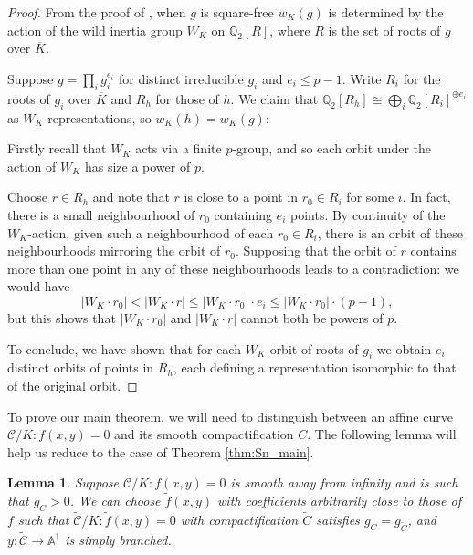 \documentclass[12pt]{amsart}
\newtheorem{lemma}[theorem]{Lemma}
\theoremstyle{definition}
\theoremstyle{remark}
\newcommand{\QQ}{\mathbb{Q}}
\renewcommand{\bar}{\overline}
\renewcommand{\tilde}{\widetilde}
\begin{document}
\begin{proof}
    From the proof of \cite[Theorem 11.3]{M2D2}, when $g$ is square-free $w_K(g)$ is determined by the action of the wild inertia group $W_K$ on $\QQ_2[R]$, where $R$ is the set of roots of $g$ over $\bar{K}$.
    
    Suppose $g=\prod_ig_i^{e_i}$ for distinct irreducible $g_i$ and $e_i\le p-1$. Write $R_i$ for the roots of $g_i$ over $\bar{K}$ and $R_h$ for those of $h$. We claim that $\QQ_2[R_h]\cong\bigoplus_i\QQ_2[R_i]^{\oplus e_i}$ as $W_K$-representations, so $w_K(h)=w_K(g)$:

    Firstly recall that $W_K$ acts via a finite $p$-group, and so each orbit under the action of $W_K$ has size a power of $p$.
    
    Choose $r\in R_h$ and note that $r$ is close to a point in $r_0\in R_i$ for some $i$. In fact, there is a small neighbourhood of $r_0$ containing $e_i$ points. By continuity of the $W_K$-action, given such a neighbourhood of each $r_0\in R_i$, there is an orbit of these neighbourhoods mirroring the orbit of $r_0$. Supposing that the orbit of $r$ contains more than one point in any of these neighbourhoods leads to a contradiction: we would have
    \[|W_K\cdot r_0|<|W_K\cdot r|\le |W_K\cdot r_0|\cdot e_i \le |W_K\cdot r_0| \cdot (p-1),\] but this shows that $|W_K\cdot r_0|$ and $|W_K\cdot r|$ cannot both be powers of $p$.

    To conclude, we have shown that for each $W_K$-orbit of roots of $g_i$ we obtain $e_i$ distinct orbits of points in $R_h$, each defining a representation isomorphic to that of the original orbit.
\end{proof}

To prove our main theorem, we will need to distinguish between an affine curve $\mathcal{C}/K: f(x,y)=0$ and its smooth compactification $C$. The following lemma will help us reduce to the case of Theorem \ref{thm:Sn_main}.

\begin{lemma}\label{lem:perturb}
    Suppose $\mathcal{C}/K: f(x,y)=0$ is smooth away from infinity and is such that $g_C>0$. We can choose $\tilde{f}(x,y)$ with coefficients arbitrarily close to those of $f$ such that $\tilde{\mathcal{C}}/K: \tilde{f}(x,y)=0$ with compactification $\tilde{C}$ satisfies $g_C=g_{\tilde{C}}$, and $y: \tilde{\mathcal{C}}\to\mathbb{A}^1$ is simply branched.
\end{lemma}
\end{document}
